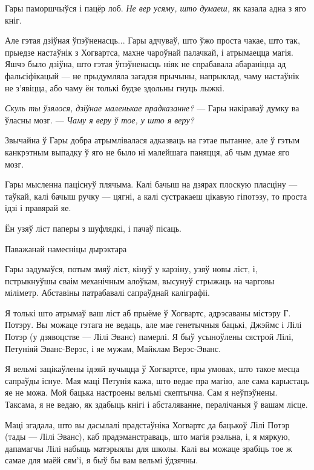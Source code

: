 Гары паморшчыўся і пацёр лоб. \emph{Не вер усяму, што думаеш,} як казала адна з яго кніг.

Але гэтая дзіўная ўпэўненасць... Гары адчуваў, што ўжо проста чакае, што так, прыедзе настаўнік з 
Хогвартса, махне чароўнай палачкай, і атрымаецца магія. Яшчэ было дзіўна, што гэтая ўпэўненасць
ніяк не спрабавала абараніцца ад фальсіфікацый --- не прыдумляла загадзя прычыны, напрыклад,
чаму настаўнік не з'явіцца, або чаму ён толькі будзе здольны гнуць лыжкі.

\emph{Скуль ты ўзялося, дзіўнае маленькае прадказанне?} --- Гары накіраваў думку ва ўласны мозг. ---
\emph{Чаму я веру ў тое, у што я веру?}

Звычайна ў Гары добра атрымлівалася адказваць на гэтае пытанне, але ў гэтым канкрэтным выпадку ў 
яго не было ні малейшага паняцця, аб чым думае яго мозг.

Гары мысленна паціснуў плячыма. Калі бачыш на дзярах плоскую пласціну --- таўкай, калі бачыш ручку
--- цягні, а калі сустракаеш цікавую гіпотэзу, то проста ідзі і правярай яе.

Ён узяў ліст паперы з шуфлядкі, і пачаў пісаць.

\medskip

{\LARGE \hpFontFasthand{}Паважанай намесніцы дырэктара}

\medskip


Гары задумаўся, потым змяў ліст, кінуў у карзіну, узяў новы ліст, і, пстрыкнуўшы сваім механічным
алоўкам, высунуў стрыжаць на чарговы міліметр. Абставіны патрабавалі сапраўднай каліграфіі.

\begin{writtenNote}

Я толькі што атрымаў ваш ліст аб прыёме ў Хогвартс, адрэсаваны містэру Г. Потэру. Вы можаце
гэтага не ведаць, але мае генетычныя бацькі, Джэймс і Лілі Потэр (у дзявоцстве --- Лілі Эванс)
памерлі. Я быў усыноўлены сястрой Лілі, Петуніяй Эванс-Верэс, і яе мужам, Майклам Верэс-Эванс.

Я вельмі зацікаўлены ідэяй вучыцца ў Хогвартсе, пры умовах, што такое месца сапраўды існуе.
Мая маці Петунія кажа, што ведае пра магію, але сама карыстаць яе не можа. Мой бацька настроены
вельмі скептычна. Сам я неўпэўнены. Таксама, я не ведаю, як здабыць кнігі і абсталяванне,
пералічаныя ў вашам лісце.

Маці згадала, што вы дасылалі прадстаўніка Хогвартс да бацькоў Лілі Потэр (тады --- Лілі Эванс),
каб прадэманстраваць, што магія рэальна, і, я мяркую, дапамагчы Лілі набыць матэрыялы для школы.
Калі вы можаце зрабіць тое ж самае для маёй сям'і, я быў бы вам вельмі ўдзячны. 



\end{writtenNote}


